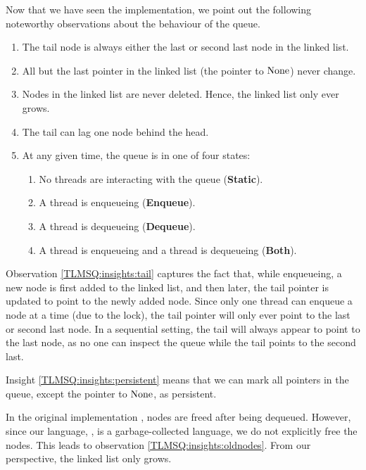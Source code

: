 \documentclass[a4paper, 10pt]{report}
\theoremstyle{definition}
\newcommand{\StaticState}{\textbf{Static}\xspace}
\newcommand{\EnqueueState}{\textbf{Enqueue}\xspace}
\newcommand{\DequeueState}{\textbf{Dequeue}\xspace}
\newcommand{\BothState}{\textbf{Both}\xspace}
\begin{document}
Now that we have seen the implementation, we point out the following noteworthy observations about the behaviour of the queue.
\begin{enumerate}
  \item\label{TLMSQ:insights:tail} The tail node is always either the last or second last node in the linked list.
  \item\label{TLMSQ:insights:persistent} All but the last pointer in the linked list (the pointer to $\operatorname{None}$) never change.
  \item\label{TLMSQ:insights:oldnodes} Nodes in the linked list are never deleted. Hence, the linked list only ever grows.
  \item\label{TLMSQ:insights:lag} The tail can lag one node behind the head.
  \item\label{TLMSQ:insights:states} At any given time, the queue is in one of four states:
    \begin{enumerate}
      \item\label{TLMSQ:insights:state:static} No threads are interacting with the queue (\StaticState).
      \item\label{TLMSQ:insights:state:enqueue} A thread is enqueueing (\EnqueueState).
      \item\label{TLMSQ:insights:state:dequeue} A thread is dequeueing (\DequeueState).
      \item\label{TLMSQ:insights:state:both} A thread is enqueueing and a thread is dequeueing (\BothState).
    \end{enumerate}
\end{enumerate}

Observation \ref{TLMSQ:insights:tail} captures the fact that, while enqueueing, a new node is first added to the linked list, and then later, the tail pointer is updated to point to the newly added node. Since only one thread can enqueue a node at a time (due to the lock), the tail pointer will only ever point to the last or second last node. In a sequential setting, the tail will always appear to point to the last node, as no one can inspect the queue while the tail points to the second last.

Insight \ref{TLMSQ:insights:persistent} means that we can mark all pointers in the queue, except the pointer to $\operatorname{None}$, as persistent.

In the original implementation \citep{DBLP:conf/podc/MichaelS96}, nodes are freed after being dequeued. However, since our language, \heaplang, is a garbage-collected language, we do not explicitly free the nodes. This leads to observation \ref{TLMSQ:insights:oldnodes}. From our perspective, the linked list only grows.
\end{document}
